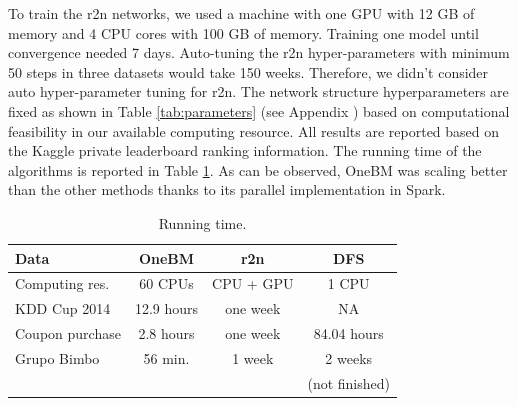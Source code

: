 To train the r2n networks, we used a machine with one GPU with 12 GB of memory and 4 CPU cores with 100 GB of memory. Training one model until convergence needed  7 days. Auto-tuning the r2n hyper-parameters with minimum 50 steps in three datasets would take 150 weeks. Therefore, we didn't consider auto hyper-parameter tuning   for r2n. The network structure hyperparameters are fixed as shown in Table \ref{tab:parameters} (see Appendix ) based on computational feasibility in our available computing resource. All results are reported based on the Kaggle private leaderboard ranking information. The running time of the algorithms is reported in Table \ref{tab:running time}. As can be observed, OneBM was scaling better than the other methods thanks to its parallel implementation in Spark.


\begin{table}
  \begin{center}
  \caption{Running time.} \label{tab:running time} 
  \begin{tabular}{ | l | c | c | c|}
    \hline
    \textbf{Data} & \textbf{OneBM} & \textbf{r2n}  & \textbf{DFS} \\ \hline
    Computing res. & 60 CPUs  & CPU + GPU& 1 CPU \\ \hline
    KDD Cup 2014 & 12.9 hours & one week&  NA \\ \hline    
    Coupon purchase &  2.8 hours &  one week&  84.04 hours \\ \hline 
    Grupo Bimbo &  56 min. &  1 week&  2 weeks \\ &&&(not finished) \\ \hline        	
  \end{tabular}
  \end{center}  
\end{table}

